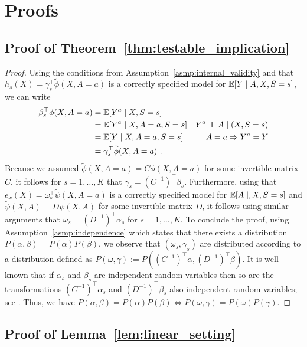 \documentclass{article}
\begin{document}
\section{Proofs} \label{app:proofs}

\subsection{Proof of Theorem~\ref*{thm:testable_implication}}\label{app:thm:testable_implication}

\begin{proof}
    Using the conditions from Assumption~\ref*{asmp:internal_validity} and that $h_s(X)=\gamma_s^\top\widetilde{\phi}(X,A=a)$ is a correctly specified model for $\mathbb{E}[Y\mid A, X, S=s]$, we can write
    \begin{align*}
        \beta_s^\top\phi(X,A=a)& = \E[Y^a\mid X, S=s]  \\
        &= \E[Y^a \mid X, A=a, S=s]  & Y^a\indep A \mid (X, S=s) \\
        &= \E[Y \mid X, A=a, S=s]  & A=a \Rightarrow Y^a=Y \\
        &= \gamma_s^\top\widetilde{\phi}(X,A=a)~.
    \end{align*}
    Because we assumed $\widetilde{\phi}(X,A=a)=C{\phi}(X,A=a)$ for some invertible matrix $C$, it follows for $s=1,\dots, K$ that $\gamma_s=(C^{-1})^\top \beta_s$. Furthermore, using that $e_x(X)=\omega_s^\top\widetilde{\psi}(X,A=a)$ is a correctly specified model for $\mathbb{E}[A\mid, X, S=s]$ and $\widetilde{\psi}(X,A)=D\psi(X,A)$ for some invertible matrix $D$, it follows using similar arguments that $\omega_s =(D^{-1})^\top \alpha_s$  for $s=1,\dots,K$. To conclude the proof, using Assumption~\ref*{asmp:independence} which states that there exists a distribution $P(\alpha,\beta)=P(\alpha)P(\beta)$, we  observe that $(\omega_s, \gamma_s)$ are distributed according to a distribution defined as $P(\omega, \gamma):=P((C^{-1})^\top\alpha, (D^{-1})^\top\beta)$. It is well-known that if $\alpha_s$ and $\beta_s$ are independent random variables then so are the transformations $(C^{-1})^\top\alpha_s$ and $ (D^{-1})^\top\beta_s$ also independent random variables; see \citet[Chapter~4.2]{grimmett2020probability}. Thus, we have $P(\alpha, \beta) = P(\alpha)P(\beta) \iff P(\omega, \gamma) = P(\omega)P(\gamma)$.
\end{proof}


\subsection{Proof of Lemma~\ref*{lem:linear_setting}}\label{app:lem:linear_setting}
\end{document}
